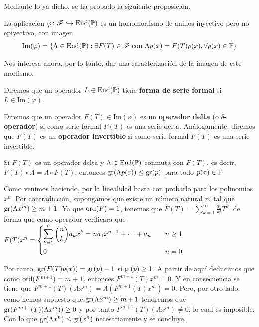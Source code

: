 Mediante lo ya dicho, se ha probado la siguiente proposición.

\begin{proposicion}
    La aplicación $\varphi \colon \mathscr{F} \hookrightarrow \operatorname*{End}(\mathbb{P})$ es un homomorfismo de anillos inyectivo pero no epiyectivo, con imagen
    \begin{equation*}
        \text{Im}(\varphi) = \{ \Lambda \in \operatorname*{End}(\mathbb{P}) : \exists F(T) \in \mathscr{F} \text{ \textnormal{con} } \Lambda p(x) = F(T)p(x), \forall p(x) \in \mathbb{P} \}
    \end{equation*}
\end{proposicion}

Nos interesa ahora, por lo tanto, dar una caracterización de la imagen de este morfismo.

\begin{definicion}
    Diremos que un operador $L \in \operatorname*{End}(\mathbb{P})$ tiene \textbf{forma de serie formal} si $L \in \text{Im}(\varphi)$.
\end{definicion}

\begin{definicion}
    Diremos que un operador $F(T) \in \text{Im}(\varphi)$ es un \textbf{operador delta} (o \textbf{$\delta$-operador}) si como serie formal $F(T)$ es una serie delta. Análogamente, diremos que $F(T)$ es un \textbf{operador invertible} si como serie formal $F(T)$ es una serie invertible. 
\end{definicion}

\begin{lema}
    Si $F(T)$ es un operador delta y $\Lambda \in \operatorname*{End}(\mathbb{P})$ conmuta con $F(T)$, es decir, $F(T) \circ \Lambda = \Lambda \circ F(T)$, entonces $\operatorname{gr}(\Lambda p(x)) \leq \operatorname{gr}(p)$ para todo $p(x) \in \mathbb{P}$
\end{lema}
\begin{demo}
    Como venimos haciendo, por la linealidad basta con probarlo para los polinomios $x^n$. Por contradicción, supongamos que existe un número natural $m$ tal que $\operatorname{gr}(\Lambda x^m) \geq m+1$. Ya que $\operatorname*{ord}(F) = 1$, tenemos que $F(T) = \sum_{k = 1}^\infty \frac{a_k}{k!}T^k$, de forma que como operador verificará que $F(T)x^n = \begin{dcases}
        \sum_{k=1}^n \binom{n}{k}a_k x^k = n a_1 x^{n-1} + \cdots + a_n \quad & n \geq 1\\
        0 & n = 0
        \end{dcases}$ 
    
    Por tanto, $\operatorname{gr}(F(T)p(x)) = \operatorname{gr}(p) - 1$ si $\operatorname{gr}(p) \geq 1$. A partir de aquí deducimos que como $\operatorname*{ord}(F^{m+1}) = m+1$, entonces $F^{m+1}(T)x^m = 0$. Y en consecuencia se tiene que $F^{m+1}(T) (\Lambda x^m) = \Lambda (F^{m+1}(T)x^m) = 0$. Pero, por otro lado, como hemos supuesto que $\operatorname{gr}(\Lambda x^m) \geq m+1$ tendremos que $\operatorname{gr}(F^{m+1}(T) (\Lambda x^m)) \geq 0$ y por tanto $F^{m+1}(T) (\Lambda x^m) \neq 0$, lo cual es imposible. Con lo que $\operatorname{gr}(\Lambda x^n) \leq \operatorname{gr}(x^n)$ necesariamente y se concluye.
\end{demo}

